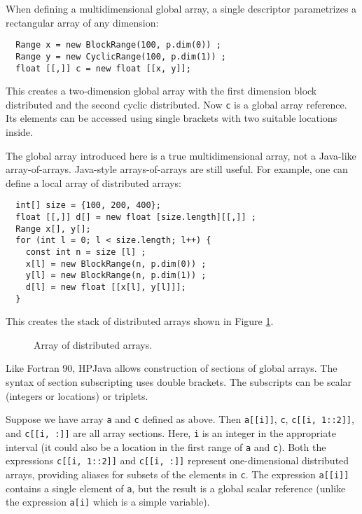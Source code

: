 When defining a multidimensional global array, a single descriptor
parametrizes a rectangular array of any dimension:
\small
\begin{verbatim}
  Range x = new BlockRange(100, p.dim(0)) ;  
  Range y = new CyclicRange(100, p.dim(1)) ;
  float [[,]] c = new float [[x, y]];
\end{verbatim}
\normalsize
This creates a two-dimension global array with the first dimension
block distributed and the second cyclic distributed.  Now \texttt{c} is a
global array reference.  Its elements can be accessed using
single brackets with two suitable locations inside.

The global array introduced here is a true multidimensional
array, not a Java-like array-of-arrays.
Java-style arrays-of-arrays are still useful. For example, one can
define a local array of distributed arrays:
\small
\begin{verbatim}
  int[] size = {100, 200, 400};
  float [[,]] d[] = new float [size.length][[,]] ;
  Range x[], y[];
  for (int l = 0; l < size.length; l++) {
    const int n = size [l] ;
    x[l] = new BlockRange(n, p.dim(0)) ;  
    y[l] = new BlockRange(n, p.dim(1)) ;  
    d[l] = new float [[x[l], y[l]]];
  }
\end{verbatim}
\normalsize
This creates the stack of distributed arrays shown in Figure \ref{fig:layer}.

\begin{figure}[tbp]
  \begin{center}
    \leavevmode
    \caption{Array of distributed arrays.}
    \label{fig:layer}
  \end{center}
\end{figure}


Like Fortran 90, HPJava allows construction of sections of global
arrays.  The syntax of section subscripting uses double brackets.  The
subscripts can be scalar (integers or locations) or triplets.

Suppose we have array \texttt{a} and \texttt{c} defined as
above.  Then \texttt{a[[i]]}, \texttt{c}, \texttt{c[[i, 1::2]]},
and \texttt{c[[i, :]]} are all array sections.  Here, {\tt i} is an
integer in the appropriate interval (it could also be a
location in the first range of {\tt a} and {\tt c}).
Both the expressions \texttt{c[[i, 1::2]]} and \texttt{c[[i, :]]}
represent one-dimensional distributed arrays, providing aliases for
subsets of the elements in \texttt{c}.  The expression \texttt{a[[i]]}
contains a single element of \texttt{a}, but the result is a global
scalar reference (unlike the expression \texttt{a[i]} which is a simple
variable).

